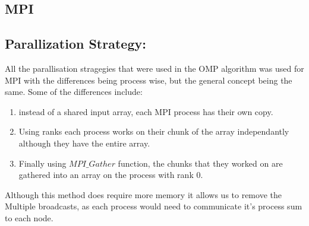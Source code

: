 \subsection{MPI}
\subsection*{Parallization Strategy:}
All the parallisation stragegies that were used in the OMP algorithm was used for MPI with the differences being process wise, but the general concept being the same. Some of the differences include: 
\begin{enumerate}
	\item instead of a shared input array, each MPI process has their own copy.
	\item Using ranks each process works on their chunk of the array independantly although they have the entire array.
	\item Finally using ${MPI\_Gather}$ function, the chunks that they worked on are gathered into an array on the process with rank 0. 
\end{enumerate}
Although this method does require more memory it allows us to remove the Multiple broadcasts, as each process would need to communicate it's process sum to each node.  
